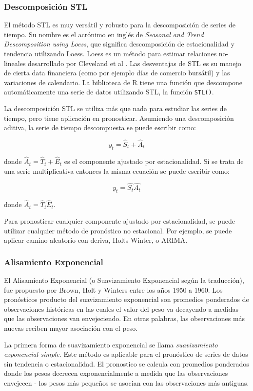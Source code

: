 \begin{spacing}{1.5}
\subsubsection{Descomposición STL}
El método STL es muy versátil y robusto para la descomposición de series de tiempo. Su nombre es el acrónimo en inglés de \emph{Seasonal and Trend Descomposition using Loess}, que significa descomposición de estacionalidad y tendencia utilizando Loess. Loess es un método para estimar relaciones no-lineales desarrollado por Cleveland et al \cite{hyndman}. Las desventajas de STL es su manejo de cierta data financiera (como por ejemplo días de comercio bursátil) y las variaciones de calendario. La biblioteca de R tiene una función que descompone automáticamente una serie de datos utilizando STL, la función \texttt{STL()}.

La descomposición STL se utiliza más que nada para estudiar las series de tiempo, pero tiene aplicación en pronosticar. Asumiendo una descomposición aditiva, la serie de tiempo descompuesta se puede escribir como:

\[ y_{t} = \hat{S}_t + \hat{A}_t \]

donde $\hat{A}_t = \hat{T}_t + \hat{E}_t$ es el componente ajustado por estacionalidad. Si se trata de una serie multiplicativa entonces la misma ecuación se puede escribir como: 

\[ y_{t} = \hat{S_t}\hat{A_t}\]

donde $\hat{A}_t = \hat{T}_t\hat{E}_t$. 

Para pronosticar cualquier componente ajustado por estacionalidad, se puede utilizar cualquier método de pronóstico no estacional. Por ejemplo, se puede aplicar camino aleatorio con deriva, Holts-Winter, o ARIMA.

\subsubsection{Alisamiento Exponencial}
El Alisamiento Exponencial (o Suavizamiento Exponencial según la traducción), fue propuesto por Brown, Holt y Winters entre los años 1950 a 1960. Los pronósticos producto del suavizamiento exponencial son promedios ponderados de observaciones históricas en las cuales el valor del peso va decayendo a medidas que las observaciones van envejeciendo. En otras palabras, las observaciones más nuevas reciben mayor asociación con el peso. 

La primera forma de suavizamiento exponencial se llama \emph{suavizamiento exponencial simple}. Este método es aplicable para el pronóstico de series de datos sin tendencia o estacionalidad. El pronostico se calcula con promedios ponderados donde los pesos decrecen exponencialmente a medida que las observaciones envejecen - los pesos más pequeños se asocian con las observaciones más antiguas. 


\end{spacing}
